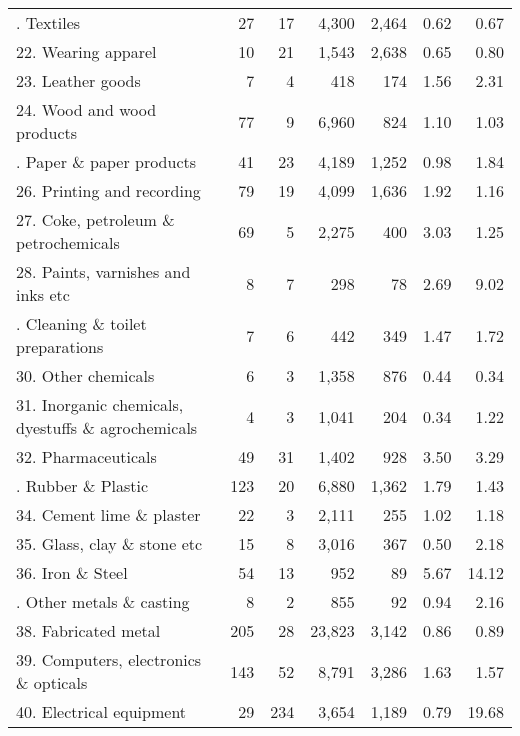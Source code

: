 {\begin{center}
\begin{longtable}{lrrrrrr}
     \hdashline[1pt/1pt]
    21. Textiles & 27    & 17    & 4,300 & 2,464 & 0.62  & 0.67 \bigstrut[t]\\
    22. Wearing apparel & 10    & 21    & 1,543 & 2,638 & 0.65  & 0.80 \\
    23. Leather goods & 7     & 4     & 418   & 174   & 1.56  & 2.31 \\
    24. Wood and wood products & 77    & 9     & 6,960 & 824   & 1.10  & 1.03 \bigstrut[b]\\
     \hdashline[1pt/1pt]
    25. Paper \& paper products & 41    & 23    & 4,189 & 1,252 & 0.98  & 1.84 \bigstrut[t]\\
    26. Printing and recording & 79    & 19    & 4,099 & 1,636 & 1.92  & 1.16 \\
    27. Coke, petroleum \& petrochemicals & 69    & 5     & 2,275 & 400   & 3.03  & 1.25 \\
    28. Paints, varnishes and inks etc & 8     & 7     & 298   & 78    & 2.69  & 9.02 \bigstrut[b]\\
     \hdashline[1pt/1pt]
    29. Cleaning \& toilet preparations & 7     & 6     & 442   & 349   & 1.47  & 1.72 \bigstrut[t]\\
    30. Other chemicals & 6     & 3     & 1,358 & 876   & 0.44  & 0.34 \\
    31. Inorganic chemicals, dyestuffs \& agrochemicals & 4     & 3     & 1,041 & 204   & 0.34  & 1.22 \\
    32. Pharmaceuticals & 49    & 31    & 1,402 & 928   & 3.50  & 3.29 \bigstrut[b]\\
     \hdashline[1pt/1pt]
    33. Rubber \& Plastic & 123   & 20    & 6,880 & 1,362 & 1.79  & 1.43 \bigstrut[t]\\
    34. Cement lime \& plaster & 22    & 3     & 2,111 & 255   & 1.02  & 1.18 \\
    35. Glass, clay \& stone etc & 15    & 8     & 3,016 & 367   & 0.50  & 2.18 \\
    36. Iron \& Steel & 54    & 13    & 952   & 89    & 5.67  & 14.12 \bigstrut[b]\\
     \hdashline[1pt/1pt]
    37. Other metals \& casting & 8     & 2     & 855   & 92    & 0.94  & 2.16 \bigstrut[t]\\
    38. Fabricated metal & 205   & 28    & 23,823 & 3,142 & 0.86  & 0.89 \\
    39. Computers, electronics \& opticals & 143   & 52    & 8,791 & 3,286 & 1.63  & 1.57 \\
    40. Electrical equipment & 29    & 234   & 3,654 & 1,189 & 0.79  & 19.68 \bigstrut[b]\\

\end{longtable}
\end{center}}
